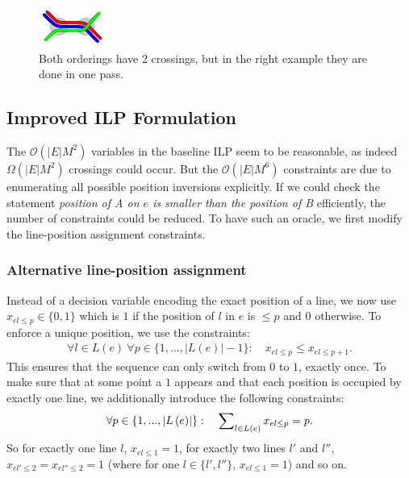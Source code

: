 \documentclass[format=acmsmall, review=false, screen=true]{acmart}
\begin{document}
\begin{figure}[t]
\begin{minipage}{.48\textwidth}
  \includegraphics[trim={2.25 2.2 2.25 2.2},clip,width=.45\textwidth]{figures/render_examples/splitting_example2.pdf}
  \caption{Both orderings have 2 crossings, but in the right example they are done in one pass.}
  \label{FIG:linesplitting2}
\end{minipage}
\end{figure}

%
\subsection{Improved ILP Formulation}\label{SEC:improved}
%
The $\mathcal{O}(|E|M^{2})$ variables in the baseline ILP seem to be reasonable, as indeed $\Omega(|E|M^{2})$ crossings could occur. But the $\mathcal{O}(|E|M^{6})$ constraints are due to enumerating all possible position inversions explicitly. If we could check the statement \emph{position of A on $e$ is smaller than the position of B} efficiently, the number of constraints could be reduced. To have such an oracle, we first modify the line-position assignment constraints.

\subsubsection{Alternative line-position assignment}
Instead of a decision variable encoding the exact position of a line, we now use $x_{el\leq p} \in \{0,1\}$ which is $1$ if the position of $l$ in $e$ is $\leq p$ and $0$ otherwise. To enforce a unique position, we use the constraints:
\begin{align}
	\forall l \in L(e)~ \forall p \in \{1, ..., \left|L\left(e\right)\right|-1\}: \quad x_{el\leq p} \leq x_{el\leq p+1}. \label{EQ:up_constr}
\end{align}
This ensures that the sequence can only switch from $0$ to $1$, exactly once. To make sure that at some point a $1$ appears and that each position is occupied by exactly one line, we additionally introduce the following constraints:
\begin{align}
	\forall p \in \{1, ..., \left|L\left(e\right)\right|\}: \quad  \sum\nolimits_{l \in L(e)} x_{el\leq p} = p. \label{EQ:01_constr}
\end{align}
So for exactly one line $l$, $x_{el\leq 1} = 1$, for exactly two lines $l'$ and $l''$, $x_{el'\leq 2} = x_{el''\leq 2} = 1$ (where for one $l \in \{l',l''\}$, $x_{el\leq 1} =1$) and so on.
\end{document}
